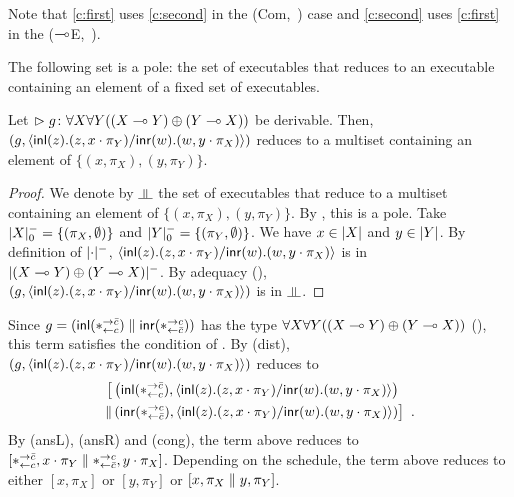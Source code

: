 Note that \ref{c:first} uses \ref{c:second} in the (Com,~\textminus)
case
and \ref{c:second} uses \ref{c:first} in the ($\multimap$E,~\textminus).

\begin{proposition}
 \label{prop:exec-on-pole}
 The following set is a pole: the set of executables that reduces to
 an executable containing an element of a fixed set of executables.
\end{proposition}

\begin{proposition}
 \label{spec:prelin}
 Let $\vartriangleright{g} \colon{\forall X\forall Y((X\multimap Y)\oplus (Y\multimap X))}$ be
 derivable.
 Then, $\left(g, \langle \mathsf{inl}({z}). ({z},{x\cdot\pi_Y})/ \mathsf{inr}({w}). ({w},{y\cdot\pi_X})\rangle\right)$
 reduces to a multiset containing an element of
 $\{(x,\pi_X), (y,\pi_Y)\}$.
\end{proposition}
\begin{proof}
 We denote by $\bbot$ the set of executables that reduce to a multiset
 containing an element of $\{(x,\pi_X), (y,\pi_Y)\}$.
 By , this is a pole.
 Take $|{X}|^-_0 = \{(\pi_X,\emptyset)\}$ and
      $|{Y}|^-_0 = \{(\pi_Y,\emptyset)\}$.
 We have $x\in|{X}|$ and $y\in|{Y}|$.
 By definition of $|{\cdot}|^-$,
 $\langle \mathsf{inl}({z}). ({z},{x\cdot\pi_Y})/ \mathsf{inr}({w}). ({w},{y\cdot\pi_X})\rangle$ is in $|{(X\multimap
 Y)\oplus (Y\multimap X)}|^-$.
 By adequacy (), $\left(g,
 \langle \mathsf{inl}({z}). ({z},{x\cdot\pi_Y})/ \mathsf{inr}({w}). ({w},{y\cdot\pi_X})\rangle\right)$ is in $\bbot$.
\end{proof}

\begin{example}
 Since $g = (\mathsf{inl}({\ast^{\rightarrow {\bar{c}}}_{\leftarrow{c}}})\parallel\mathsf{inr}({\ast^{\rightarrow {c}}_{\leftarrow{\bar{c}}}}))$ has the type
 $\forall X\forall Y((X\multimap Y)\oplus (Y\multimap X))$ (),
 this term satisfies the condition of .
 By (dist),
 $\left(g, \langle \mathsf{inl}({z}). ({z},{x\cdot\pi_Y})/ \mathsf{inr}({w}). ({w},{y\cdot\pi_X})\rangle\right)$
 reduces to
 \begin{align*}
  \bigl[& \left(\mathsf{inl}({\ast^{\rightarrow {\bar{c}}}_{\leftarrow{c}}}),
  \langle \mathsf{inl}({z}). ({z},{x\cdot\pi_Y})/ \mathsf{inr}({w}). ({w},{y\cdot\pi_X})\rangle\right) \\ \parallel
  & \left(\mathsf{inr}({\ast^{\rightarrow {c}}_{\leftarrow{\bar{c}}}}), \langle \mathsf{inl}({z}). ({z},{x\cdot\pi_Y})/ \mathsf{inr}({w}). ({w},{y\cdot\pi_X})\rangle\right)\bigr]\enspace.
 \end{align*}
 By (ansL), (ansR) and (cong), the term above reduces to
 $[\ast^{\rightarrow {\bar{c}}}_{\leftarrow{c}}, x\cdot\pi_Y\parallel \ast^{\rightarrow {c}}_{\leftarrow{\bar{c}}},y\cdot\pi_X]$.
 Depending on the schedule,  the term above reduces to either
 $[x,\pi_X]$ or $[y,\pi_Y]$ or $[x,\pi_X\parallel y,\pi_Y]$.
\end{example}

